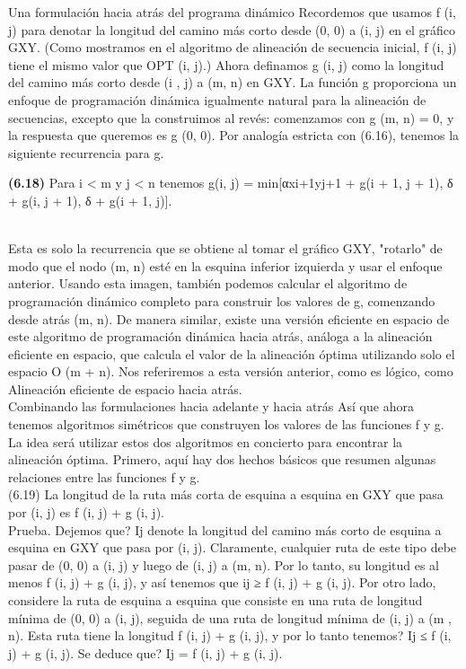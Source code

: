 \documentclass[a4paper]{article}
\begin{document}
Una formulación hacia atrás del programa dinámico Recordemos que usamos f (i, j) para denotar la longitud del camino más corto desde (0, 0) a (i, j) en el gráfico GXY. (Como mostramos en el algoritmo de alineación de secuencia inicial, f (i, j) tiene el mismo valor que OPT (i, j).) Ahora definamos g (i, j) como la longitud del camino más corto desde (i , j) a (m, n) en GXY. La función g proporciona un enfoque de programación dinámica igualmente natural para la alineación de secuencias, excepto que la construimos al revés: comenzamos con g (m, n) = 0, y la respuesta que queremos es g (0, 0). Por analogía estricta con (6.16), tenemos la siguiente recurrencia para g.\\


\colorbox{mygray}{\parbox{15cm}{
\textbf{(6.18)} Para i < m y j < n tenemos
g(i, j) = min[αxi+1yj+1 + g(i + 1, j + 1), δ + g(i, j + 1), δ + g(i + 1, j)].}}\\

Esta es solo la recurrencia que se obtiene al tomar el gráfico GXY, "rotarlo" de modo que el nodo (m, n) esté en la esquina inferior izquierda y usar el enfoque anterior. Usando esta imagen, también podemos calcular el algoritmo de programación dinámico completo para construir los valores de g, comenzando desde atrás (m, n). De manera similar, existe una versión eficiente en espacio de este algoritmo de programación dinámica hacia atrás, análoga a la alineación eficiente en espacio, que calcula el valor de la alineación óptima utilizando solo el espacio O (m + n). Nos referiremos a esta versión anterior, como es lógico, como Alineación eficiente de espacio hacia atrás.\\

Combinando las formulaciones hacia adelante y hacia atrás Así que ahora tenemos algoritmos simétricos que construyen los valores de las funciones f y g. La idea será utilizar estos dos algoritmos en concierto para encontrar la alineación óptima. Primero, aquí hay dos hechos básicos que resumen algunas relaciones entre las funciones f y g.\\

(6.19) La longitud de la ruta más corta de esquina a esquina en GXY que pasa por (i, j) es f (i, j) + g (i, j).\\

Prueba. Dejemos que? Ij denote la longitud del camino más corto de esquina a esquina en GXY que pasa por (i, j). Claramente, cualquier ruta de este tipo debe pasar de (0, 0) a (i, j) y luego de (i, j) a (m, n). Por lo tanto, su longitud es al menos f (i, j) + g (i, j), y así tenemos que ij ≥ f (i, j) + g (i, j). Por otro lado, considere la ruta de esquina a esquina que consiste en una ruta de longitud mínima de (0, 0) a (i, j), seguida de una ruta de longitud mínima de (i, j) a (m , n). Esta ruta tiene la longitud f (i, j) + g (i, j), y por lo tanto tenemos? Ij ≤ f (i, j) + g (i, j). Se deduce que? Ij = f (i, j) + g (i, j).\\
\end{document}

